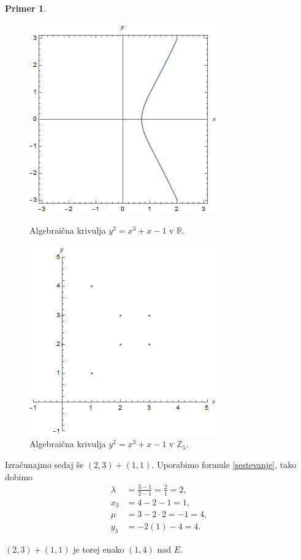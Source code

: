 \documentclass[12pt,a4paper,twoside]{article}
\theoremstyle{definition} %
\newtheorem{primer}[definicija]{Primer}
\theoremstyle{plain} %
\numberwithin{equation}{section}  %
\newcommand{\R}{\mathbb R}
\newcommand{\Z}{\mathbb Z}
\begin{document}
\begin{primer}
\begin{figure}[ht]
  \centering
\begin{minipage}{.45\textwidth}
\centering
  \includegraphics[scale = 0.5]{images/krivuljamod0.png}
  \caption[Primer algebraične krivulje.]{Algebraična krivulja $y^2 = x^3+x-1$ v $\R$.}
  \label{fig:krivuljamod0}
\end{minipage}%
\hfill
\begin{minipage}{.45\textwidth}
\centering
\includegraphics[scale=0.5]{images/krivuljamod1.png}
\caption[Presek algebraične krivulje z ravnino $z=1$.]{Algebraična krivulja $y^2 = x^3+x-1$ v $\Z_5$.}
\label{fig:krivuljamod1}
\end{minipage}
\end{figure}

Izračunajmo sedaj še $(2,3)+(1,1)$. Uporabimo formule \ref{sestevanje}, tako dobimo
\begin{align}
\lambda &{}=\frac{3-1}{2-1} = \frac{2}{1} = 2, \nonumber \\ 
x_3 &{} = 4-2-1 = 1, \nonumber \\
\mu &{}= 3-2\cdot 2 = -1 = 4, \nonumber \\
y_3 &{} = -2(1)-4 = 4. \nonumber
\end{align}

$(2,3)+(1,1)$ je torej enako $(1,4)$ nad $E$.

\end{primer}
\end{document}
